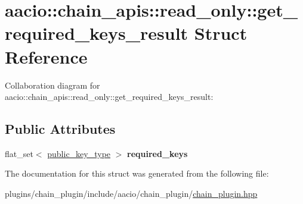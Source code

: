 \hypertarget{structaacio_1_1chain__apis_1_1read__only_1_1get__required__keys__result}{}\section{aacio\+:\+:chain\+\_\+apis\+:\+:read\+\_\+only\+:\+:get\+\_\+required\+\_\+keys\+\_\+result Struct Reference}
\label{structaacio_1_1chain__apis_1_1read__only_1_1get__required__keys__result}


Collaboration diagram for aacio\+:\+:chain\+\_\+apis\+:\+:read\+\_\+only\+:\+:get\+\_\+required\+\_\+keys\+\_\+result\+:
\subsection*{Public Attributes}
\begin{DoxyCompactItemize}
\item 
\mbox{\label{structaacio_1_1chain__apis_1_1read__only_1_1get__required__keys__result_ac207c6276f3014edd967b947216ce193}} 
flat\+\_\+set$<$ \mbox{\hyperlink{classfc_1_1crypto_1_1public__key}{public\+\_\+key\+\_\+type}} $>$ {\bfseries required\+\_\+keys}
\end{DoxyCompactItemize}


The documentation for this struct was generated from the following file\+:\begin{DoxyCompactItemize}
\item 
plugins/chain\+\_\+plugin/include/aacio/chain\+\_\+plugin/\mbox{\hyperlink{chain__plugin_8hpp}{chain\+\_\+plugin.\+hpp}}\end{DoxyCompactItemize}
